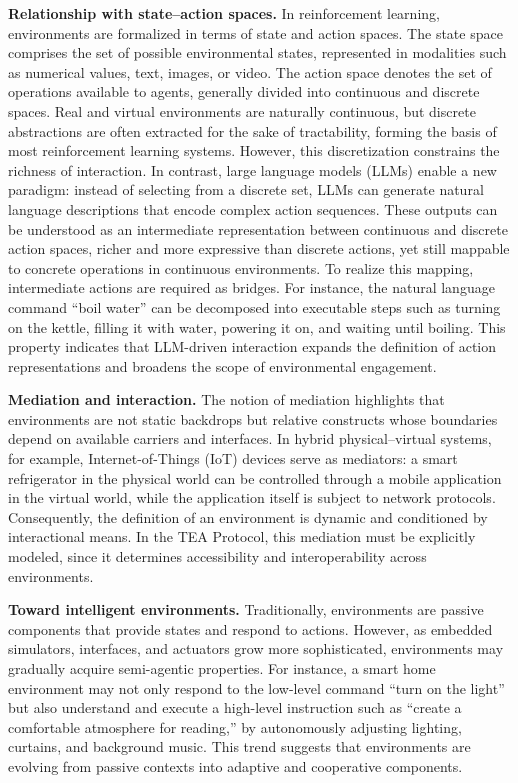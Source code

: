 \documentclass[11pt]{article}
\begin{document}
\textbf{Relationship with state–action spaces.} In reinforcement learning, environments are formalized in terms of state and action spaces. The state space comprises the set of possible environmental states, represented in modalities such as numerical values, text, images, or video. The action space denotes the set of operations available to agents, generally divided into continuous and discrete spaces. Real and virtual environments are naturally continuous, but discrete abstractions are often extracted for the sake of tractability, forming the basis of most reinforcement learning systems. However, this discretization constrains the richness of interaction. In contrast, large language models (LLMs) enable a new paradigm: instead of selecting from a discrete set, LLMs can generate natural language descriptions that encode complex action sequences. These outputs can be understood as an intermediate representation between continuous and discrete action spaces, richer and more expressive than discrete actions, yet still mappable to concrete operations in continuous environments. To realize this mapping, intermediate actions are required as bridges. For instance, the natural language command ``boil water'' can be decomposed into executable steps such as turning on the kettle, filling it with water, powering it on, and waiting until boiling. This property indicates that LLM-driven interaction expands the definition of action representations and broadens the scope of environmental engagement.  

\textbf{Mediation and interaction.} The notion of mediation highlights that environments are not static backdrops but relative constructs whose boundaries depend on available carriers and interfaces. In hybrid physical–virtual systems, for example, Internet-of-Things (IoT) devices serve as mediators: a smart refrigerator in the physical world can be controlled through a mobile application in the virtual world, while the application itself is subject to network protocols. Consequently, the definition of an environment is dynamic and conditioned by interactional means. In the TEA Protocol, this mediation must be explicitly modeled, since it determines accessibility and interoperability across environments.  

\textbf{Toward intelligent environments.} Traditionally, environments are passive components that provide states and respond to actions. However, as embedded simulators, interfaces, and actuators grow more sophisticated, environments may gradually acquire semi-agentic properties. For instance, a smart home environment may not only respond to the low-level command ``turn on the light'' but also understand and execute a high-level instruction such as ``create a comfortable atmosphere for reading,'' by autonomously adjusting lighting, curtains, and background music. This trend suggests that environments are evolving from passive contexts into adaptive and cooperative components.  
\end{document}
